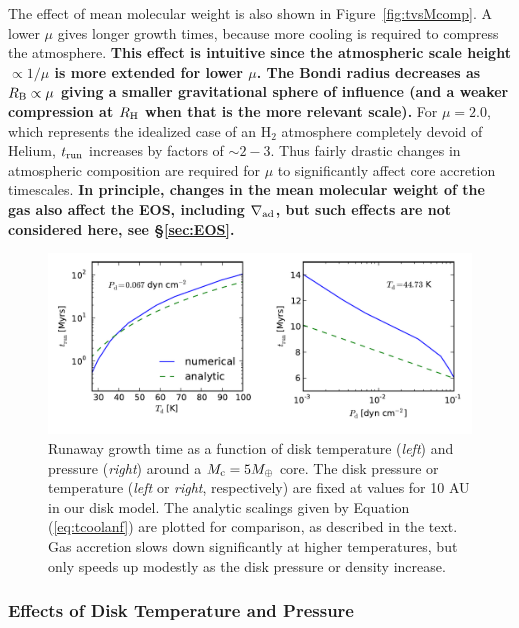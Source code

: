 \documentclass[apj, numberedappendix]{emulateapj}
\newcommand{\Eq}[1]{Equation\,(\ref{#1})}
\newcommand{\Fig}[1]{Figure~\ref{#1}}
\newcommand{\delad}{\nabla_{\rm ad}}
\newcommand{\RB}{R_{\rm B}}
\newcommand{\RH}{R_{\rm H}}
\begin{document}
The effect of mean molecular weight is also shown in \Fig{fig:tvsMcomp}.  A lower $\mu$ gives longer growth times, because more cooling is required to compress the atmosphere.  \textbf{This effect is intuitive since the atmospheric scale height $\propto 1/\mu$ is more extended for lower $\mu$.   The Bondi radius decreases as $\RB \propto \mu$ giving a smaller gravitational sphere of influence (and a weaker compression at $\RH$ when that is the more relevant scale).} For $\mu = 2.0$, which represents the idealized case of an H$_2$ atmosphere completely devoid of Helium, $t_{\rm run}$ increases by factors of $\sim 2 - 3$.  Thus fairly drastic changes in atmospheric composition are required for $\mu$ to significantly affect core accretion timescales. \textbf{In principle, changes in the mean molecular weight of the gas also affect the EOS, including $\delad$, but such effects are not considered here, see \S\ref{sec:EOS}.}



\begin{figure}[tb]
\centering
\includegraphics[width=1.\textwidth]{TdPd_effect.pdf}
\vspace{-0.3in}
\caption{Runaway growth time as a function of disk temperature (\emph{left}) and pressure (\emph{right}) around a $M_{\rm c} = 5 M_{\oplus}$ core.   The disk pressure or temperature (\emph{left} or \emph{right}, respectively) are fixed at values for 10 AU in our disk model.   The analytic scalings given by \Eq{eq:tcoolanf} are plotted for comparison, as described in the text.  Gas accretion slows down significantly at higher temperatures, but only speeds up modestly as the disk pressure or density increase.} 
\label{fig:TPeffects}
\end{figure}


\subsubsection{Effects of Disk Temperature and Pressure}
\label{sec:TPeffects}
\end{document}
